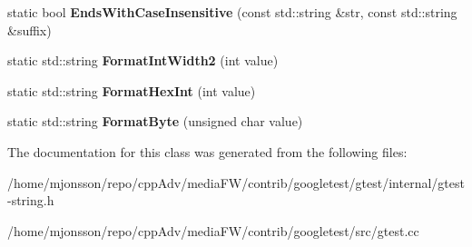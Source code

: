 \begin{DoxyCompactItemize}
\mbox{\label{classtesting_1_1internal_1_1String_a968f242b709f8c7c0ed5ecf246553321}} 
static bool {\bfseries Ends\+With\+Case\+Insensitive} (const std\+::string \&str, const std\+::string \&suffix)
\item 
\mbox{\label{classtesting_1_1internal_1_1String_af50b18d588355871e1982c4043523e0f}} 
static std\+::string {\bfseries Format\+Int\+Width2} (int value)
\item 
\mbox{\label{classtesting_1_1internal_1_1String_affe59102e49092fc0684388e9b0c5c1e}} 
static std\+::string {\bfseries Format\+Hex\+Int} (int value)
\item 
\mbox{\label{classtesting_1_1internal_1_1String_af702dc7cbd569589d8e3ff215a7cafa9}} 
static std\+::string {\bfseries Format\+Byte} (unsigned char value)
\end{DoxyCompactItemize}


The documentation for this class was generated from the following files\+:\begin{DoxyCompactItemize}
\item 
/home/mjonsson/repo/cpp\+Adv/media\+F\+W/contrib/googletest/gtest/internal/gtest-\/string.\+h\item 
/home/mjonsson/repo/cpp\+Adv/media\+F\+W/contrib/googletest/src/gtest.\+cc\end{DoxyCompactItemize}
